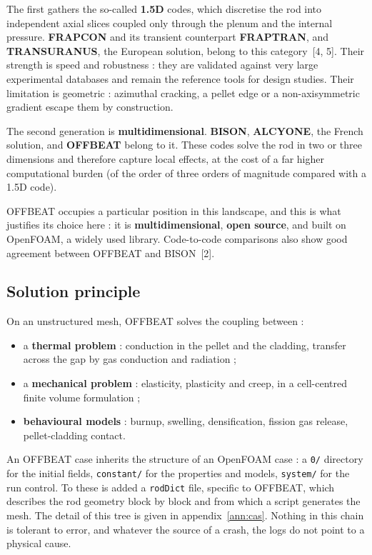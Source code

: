 \documentclass[12pt,a4paper]{report}
\begin{document}
The first gathers the so-called \textbf{1.5D} codes, which discretise the rod
into independent axial slices coupled only through the plenum and the internal
pressure. \textbf{FRAPCON} and its transient counterpart \textbf{FRAPTRAN}, and
\textbf{TRANSURANUS}, the European solution, belong to this category~[4, 5].
Their strength is speed and robustness : they are validated against very large
experimental databases and remain the reference tools for design studies. Their
limitation is geometric : azimuthal cracking, a pellet edge or a non-axisymmetric
gradient escape them by construction.

The second generation is \textbf{multidimensional}. \textbf{BISON},
\textbf{ALCYONE}, the French solution, and \textbf{OFFBEAT} belong to it. These
codes solve the rod in two or three dimensions and therefore capture local
effects, at the cost of a far higher computational burden (of the order of three
orders of magnitude compared with a 1.5D code).

OFFBEAT occupies a particular position in this landscape, and this is what
justifies its choice here : it is \textbf{multidimensional}, \textbf{open
source}, and built on OpenFOAM, a widely used library. Code-to-code comparisons
also show good agreement between OFFBEAT and BISON~[2].

\subsection{Solution principle}

On an unstructured mesh, OFFBEAT solves the coupling between :
\begin{itemize}
  \item a \textbf{thermal problem} : conduction in the pellet and the cladding,
    transfer across the gap by gas conduction and radiation ;
  \item a \textbf{mechanical problem} : elasticity, plasticity and creep, in a
    cell-centred finite volume formulation ;
  \item \textbf{behavioural models} : burnup, swelling, densification, fission
    gas release, pellet-cladding contact.
\end{itemize}

An OFFBEAT case inherits the structure of an OpenFOAM case : a
\texttt{0/} directory for the initial fields, \texttt{constant/} for the
properties and models, \texttt{system/} for the run control. To these is added a
\texttt{rodDict} file, specific to OFFBEAT, which describes the rod geometry
block by block and from which a script generates the mesh. The detail of this
tree is given in appendix~\ref{ann:cas}. Nothing in this chain is tolerant to
error, and whatever the source of a crash, the logs do not point to a physical
cause.
\end{document}
